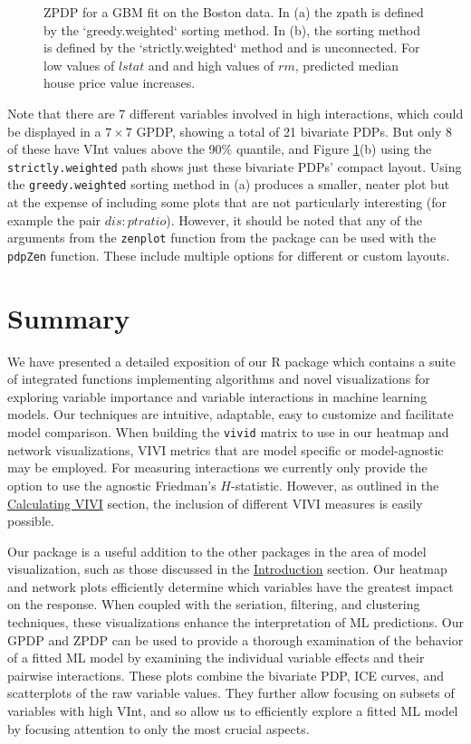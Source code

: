 \begin{figure}
{}

\caption{ZPDP for a GBM fit on the Boston data. In (a) the zpath is defined by the `greedy.weighted` sorting method. In (b), the sorting method is defined by the `strictly.weighted` method and is unconnected. For low values of $lstat$ and and high values of $rm$, predicted median house price value increases.}\label{fig:zpdpGBM}
\end{figure}

Note that there are 7 different variables involved in high interactions, which could be displayed in a \(7 \times 7\) GPDP, showing a total of 21 bivariate PDPs. But only 8 of these have VInt values above the 90\% quantile, and Figure \ref{fig:zpdpGBM}(b) using the \texttt{strictly.weighted} path shows just these bivariate PDPs' compact layout. Using the \texttt{greedy.weighted} sorting method in (a) produces a smaller, neater plot but at the expense of including some plots that are not particularly interesting (for example the pair \(dis:ptratio\)). However, it should be noted that any of the arguments from the \texttt{zenplot} function from the  package can be used with the \texttt{pdpZen} function. These include multiple options for different or custom layouts.

\hypertarget{summary}{%
\section{Summary}\label{summary}}

We have presented a detailed exposition of our R package  which contains a suite of integrated functions implementing algorithms and novel visualizations for exploring variable importance and variable interactions in machine learning models. Our techniques are intuitive, adaptable, easy to customize and facilitate model comparison. When building the \texttt{vivid} matrix to use in our heatmap and network visualizations, VIVI metrics that are model specific or model-agnostic may be employed. For measuring interactions we currently only provide the option to use the agnostic Friedman's \(H\)-statistic. However, as outlined in the \protect\hyperlink{data}{Calculating VIVI} section, the inclusion of different VIVI measures is easily possible.

Our  package is a useful addition to the other packages in the area of model visualization, such as those discussed in the \protect\hyperlink{introduction}{Introduction} section. Our heatmap and network plots efficiently determine which variables have the greatest impact on the response. When coupled with the seriation, filtering, and clustering techniques, these visualizations enhance the interpretation of ML predictions. Our GPDP and ZPDP can be used to provide a thorough examination of the behavior of a fitted ML model by examining the individual variable effects and their pairwise interactions. These plots combine the bivariate PDP, ICE curves, and scatterplots of the raw variable values. They further allow focusing on subsets of variables with high VInt, and so allow us to efficiently explore a fitted ML model by focusing attention to only the most crucial aspects.

